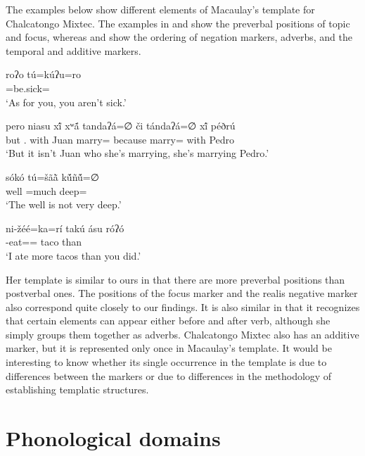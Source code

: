\documentclass[output=paper]{langscibook}
\begin{document}
The examples below show different elements of Macaulay's template for Chalcatongo Mixtec. The examples in  and  show the preverbal positions of topic and focus, whereas  and  show the ordering of negation markers, adverbs, and the temporal and additive markers.

\ea 
 \ea \label{ex:macaulay_top} 
    \gll roʔo tú=kúʔu=ro \\
         \Ssg{} \Neg=be.sick=\Ssg{} \\
    \glt `As for you, you aren't sick.' \hfill \citep[106]{macaulay1996grammar}
   
   \ex \label{ex:macaulay_negfoc} 
    \gll pero niasu x\'{ĩ} xʷ\'{ã} tandaʔá=∅ či tándaʔá=∅ x\'{ĩ} péðrú \\
         but \Neg.\Foc{} with Juan marry=\Tsg{} because marry=\Tsg{} with Pedro \\
    \glt `But it isn't Juan who she's marrying, she's marrying Pedro.' \hfill \citep[123]{macaulay1996grammar}
    
    \ex \label{ex:macaulay_neg_adv} 
    \gll sókó tú=šã\`{ã} k\'{ũ}ñ\'{ũ}=∅  \\
         well \Neg=much deep=\Tsg{} \\
    \glt `The well is not very deep.' \hfill \citep[120]{macaulay1996grammar}
    
    \ex \label{ex:macaulay_add}
    \gll ni-žéé=ka=rí takú ásu róʔó \\
         \Compl-eat=\Add=\Fsg{} taco than \Ssg{} \\
    \glt `I ate more tacos than you did.' \hfill \citep[141]{macaulay1996grammar}
 \z
\z


Her template is similar to ours in that there are more preverbal positions than postverbal ones. The positions of the focus marker and the realis negative marker also correspond quite closely to our findings. 
It is also similar in that it recognizes that certain elements can appear either before and after verb, although she simply groups them together as adverbs. 
Chalcatongo Mixtec also has an additive marker, but it is represented only once in Macaulay's template. It would be interesting to know whether its single occurrence in the template is due to differences between the markers or due to differences in the methodology of establishing templatic structures.



\section{Phonological domains} %
\label{sec:phonologicaldomains}
\end{document}

